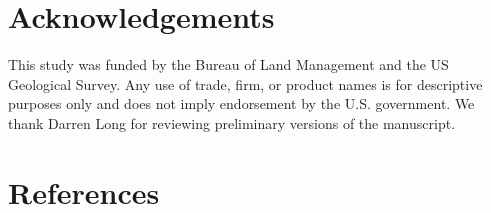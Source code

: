 \documentclass[
  12pt,
]{article}
\begin{document}
\hypertarget{acknowledgements}{%
\section{Acknowledgements}\label{acknowledgements}}

This study was funded by the Bureau of Land Management and the US Geological Survey.
Any use of trade, firm, or product names is for descriptive purposes only and does not imply endorsement by the U.S. government.
We thank Darren Long for reviewing preliminary versions of the manuscript.

\hypertarget{references}{%
\section{References}\label{references}}

\setlength{\parindent}{-0.2in}
\setlength{\leftskip}{0.2in}
\setlength{\parskip}{8pt}

\noindent
\end{document}
